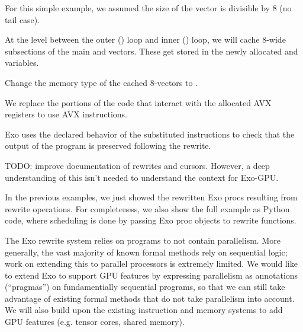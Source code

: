 For this simple example, we assumed the size of the vector is divisible by 8 (no tail case).

\filbreak
{}

At the level between the outer () loop and inner () loop, we will cache 8-wide subsections of the main  and  vectors.
These get stored in the newly allocated  and  variables.



\filbreak
{}

Change the memory type of the cached 8-vectors to .



\filbreak
{}



We replace the portions of the code that interact with the allocated AVX registers to use AVX instructions.


\filbreak


\filbreak
Exo uses the declared behavior of the substituted instructions to check that the output of the program is preserved following the rewrite.

\filbreak
{}

TODO: improve documentation of rewrites and cursors.
However, a deep understanding of this isn't needed to understand the context for Exo-GPU.

\filbreak
In the previous examples, we just showed the rewritten Exo procs resulting from rewrite operations.
For completeness, we also show the full example as Python code, where scheduling is done by passing Exo proc objects to rewrite functions.

\filbreak

\filbreak

\filbreak

\filbreak

\filbreak


\filbreak
{}

The Exo rewrite system relies on programs to not contain parallelism.
More generally, the vast majority of known formal methods rely on sequential logic; work on extending this to parallel processors is extremely limited.
We would like to extend Exo to support GPU features by expressing parallelism as annotations (``pragmas'') on fundamentially sequential programs, so that we can still take advantage of existing formal methods that do not take parallelism into account.
We will also build upon the existing instruction and memory systems to add GPU features (e.g. tensor cores, shared memory).


